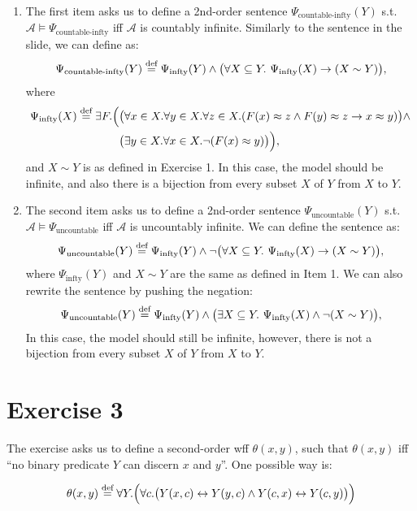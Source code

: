\documentclass[11pt]{article}
\newcommand{\defn}{\overset{\text{\scriptsize def}}{=}}
\begin{document}
\begin{enumerate}
    \item The first item asks us to define a 2nd-order sentence $\Psi_{\text{countable-infty}}(Y)$ s.t. $\mathcal{A} \models \Psi_{\text{countable-infty}}$ iff $\mathcal{A}$ is countably infinite. Similarly to the sentence in the slide, we can define as:
    $$\Psi_{\text{countable-infty}}(Y) \defn \Psi_{\text{infty}}(Y) \land \big(\forall X \subseteq Y.\ \Psi_{\text{infty}}(X) \to (X \sim Y) \big),$$
    where
    \begin{align*}
        \Psi_{\text{infty}}(X) \defn \exists F. \Big(& \big(\forall x \in X. \forall y \in X. \forall z \in X.(F(x) \approx z \land F(y) \approx z \to x \approx y)\big) \land \\
        & \big(\exists y \in X. \forall x \in X. \lnot (F(x) \approx y)\big)\Big),
    \end{align*}
    and $X \sim Y$ is as defined in Exercise 1.
    In this case, the model should be infinite, and also there is a bijection from every subset $X$ of $Y$ from $X$ to $Y$.
    \item The second item asks us to define a 2nd-order sentence $\Psi_{\text{uncountable}}(Y)$ s.t. $\mathcal{A} \models \Psi_{\text{uncountable}}$ iff $\mathcal{A}$ is uncountably infinite. We can define the sentence as:
    $$\Psi_{\text{uncountable}}(Y) \defn \Psi_{\text{infty}}(Y) \land \lnot \big(\forall X \subseteq Y.\ \Psi_{\text{infty}}(X) \to (X \sim Y) \big),$$
    where $\Psi_{\text{infty}}(Y)$ and $X \sim Y$ are the same as defined in Item 1.
    We can also rewrite the sentence by pushing the negation:
    $$\Psi_{\text{uncountable}}(Y) \defn \Psi_{\text{infty}}(Y) \land \big(\exists X \subseteq Y.\ \Psi_{\text{infty}}(X) \land \lnot (X \sim Y) \big),$$
    In this case, the model should still be infinite, however, there is not a bijection from every subset $X$ of $Y$ from $X$ to $Y$.
\end{enumerate}

\section*{Exercise 3}

The exercise asks us to define a second-order wff $\theta (x, y)$, such that $\theta(x,y)$ iff ``no binary predicate $Y$ can discern $x$ and $y$''. One possible way is:

$$\theta(x, y) \defn \forall Y.\Big(\forall c. \big(Y(x, c) \leftrightarrow Y(y, c) \land Y(c, x) \leftrightarrow Y(c, y)\big)\Big)$$
\end{document}
